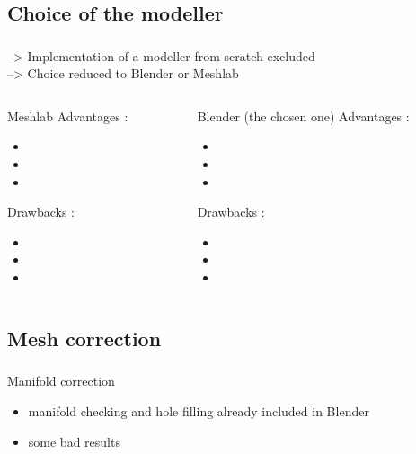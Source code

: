 \documentclass{beamer}
\begin{document}
\subsection{Choice of the modeller}
\begin{frame}
	\frametitle{}
		--> Implementation of a modeller from scratch excluded \\
		--> Choice reduced to Blender or Meshlab
    \begin{columns}[t]
  	\begin{column}{5cm}
  		\begin{block}{Meshlab}
  		Advantages :
  		\begin{itemize}
  		\item 
  		\item 
  		\item
  		\end{itemize}
  		
  		Drawbacks :
  		\begin{itemize}
  		\item 
  		\item 
  		\item
  		\end{itemize}
 	 	\end{block}   
  	\end{column}
  
  	\begin{column}{5cm}
  		\begin{block}{Blender (the chosen one)}
  		Advantages :
  		\begin{itemize}
  		\item 
  		\item 
  		\item
  		\end{itemize}
  		
  		Drawbacks :
  		\begin{itemize}
  		\item 
  		\item 
  		\item
  		\end{itemize}
 	 	\end{block}   
  	\end{column}
 	\end{columns}  
    
\end{frame}

\subsection{Mesh correction}
\begin{frame}
	\frametitle{}

    \begin{block}{Manifold correction}
		\begin{itemize}
			\item manifold checking and hole filling already included in Blender
			\item some bad results
		\end{itemize}
    \end{block}
\end{frame}
\end{document}
